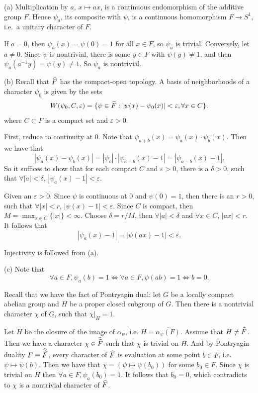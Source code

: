 \begin{solution}
(a) Multiplication by $a$, $x \mapsto ax$, is a continuous endomorphism of the
additive group $F$. Hence $\psi_a$, its composite with $\psi$, is a continuous
homomorphism $F \to S^1$, i.e.\ a unitary character of $F$.

If $a = 0$, then $\psi_a(x) = \psi(0) = 1$ for all $x \in F$, so $\psi_a$ is
trivial. Conversely, let $a \neq 0$. Since $\psi$ is nontrivial, there is some
$y \in F$ with $\psi(y) \neq 1$, and then $\psi_a(a^{-1}y) = \psi(y) \neq 1$.
So $\psi_a$ is nontrivial.

(b) Recall that $\widehat{F}$ has the compact-open topology. A basis of neighborhoods of a
character $\psi_0$ is given by the sets
\[W(\psi_0, C, \varepsilon) = \{\psi \in \widehat{F}:  |\psi(x) - \psi_0(x)| < \varepsilon, \forall x \in C \}. \]
where $C\subset F$ is a compact set and $\varepsilon > 0$.

First, reduce to continuity at $0$. Note that $\psi_{a + b} (x)= \psi_a (x) \cdot \psi_b(x)$.
Then we have that
\[|\psi_a(x)- \psi_b(x)| = |\psi_b|\cdot |\psi_{a-b}(x) - 1 | = |\psi_{a-b}(x) - 1|. \]
So it suffices to show that for each compact $C$ and $\varepsilon > 0$, there is a $\delta >0$, such
that
$\forall |a| < \delta$, $|\psi_a(x) - 1| < \varepsilon$.

Given an $\varepsilon > 0$. Since $\psi$ is continuous at $0$ and $\psi(0) = 1$, then there is an $r > 0$, such that
$\forall |x| < r$, $|\psi(x) - 1|< \varepsilon$. Since $C$ is compact, then $M = \max_{x \in C} \{ |x|\} < \infty$.
Choose $\delta = r / M$, then $\forall |a| < \delta$ and $\forall x \in C$, $|a x| < r$.
It follows that
\[|\psi_a(x) - 1| = |\psi(ax) - 1| < \varepsilon. \]

Injectivity is followed from (a).

(c)
Note that
\[\forall a \in F, \psi_a(b) = 1 \iff \forall a \in F, \psi(a b) = 1 \iff b = 0. \]

Recall that we have the fact of Pontryagin dual: let $G$ be a locally compact abelian group
and $H$ be a proper closed subgroup of $G$. Then there is a nontrivial character $\chi$ of $G$, such that
$\chi|_H = 1$.

Let $H$ be the closure of the image of $\alpha_\psi$, i.e. $H = \overline{\alpha_\psi(F)}$.
Assume that $H \neq \widehat{F}$. Then we have a character $\chi \in \widehat{\widehat{F}}$ such that
$\chi$ is trivial on $H$. And by Pontryagin duality $F \equiv \widehat{\widehat{F}}$, every character
of $\widehat{F}$ is evaluation at some point $b \in F$, i.e. $\psi \mapsto \psi (b)$.
Then we have that $\chi = (\psi \mapsto \psi(b_0))$ for some $b_0 \in F$. Since
$\chi$ is trivial on $H$ then $\forall a \in F, \psi_a(b_0) = 1$. It follows that
$b_0 = 0$, which contradicts to $\chi$ is a nontrivial character of $\widehat{F}$.


\end{solution}
